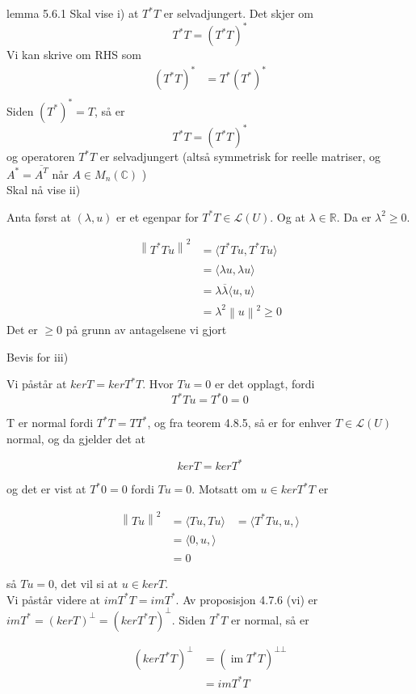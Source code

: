 \documentclass[a4paper,norsk]{article}
\renewcommand{\geq}{\geqslant}
\begin{document}
\begin{proofbox}{lemma 5.6.1}{}
Skal vise i) at $ T^* T $ er selvadjungert. Det skjer om
\[
    T^*T = \left( T^*T \right) ^*
\]
Vi kan skrive om RHS som \begin{align*}
    \left( T^*T \right) ^* &= T^* \left( T^* \right) ^*\\
\end{align*}
Siden $ \left( T^* \right) ^*  = T $, så er
\[
    T^*T = \left( T^*T \right) ^*
\]
og operatoren $ T^*T $ er selvadjungert (altså symmetrisk for reelle matriser, og $ A^* = \overline{A^T}$ når $ A \in M_n(\mathbb{C}) $ )\\


Skal nå vise ii)

Anta først at $ \left( \lambda , u \right)  $ er et egenpar for $ T^*T \in \mathcal{L}(U) $. Og at $ \lambda \in \mathbb{R} $. Da er $ \lambda ^2 \geq 0 $. 

\begin{align*}
    \left\lVert T^*Tu \right\rVert ^2 &= \langle T^*Tu, T^*Tu \rangle_{  } \\
    &= \langle \lambda u, \lambda u  \rangle_{  }  \\
    &= \lambda \overline{\lambda } \langle u, u  \rangle_{  } \\
    &= \lambda ^2 \left\lVert u \right\rVert ^2 \geq 0
\end{align*}
Det er $ \geq 0 $ på grunn av antagelsene vi gjort


Bevis for iii)

Vi påstår at $ ker T = ker T^*T $. Hvor $ Tu = 0 $ er det opplagt, fordi 
\[
    T^*Tu = T^*0 = 0
\]

T er normal fordi $ T^*T = TT^* $, og fra teorem 4.8.5, så er for enhver $ T \in \mathcal{L}(U) $ normal, og da gjelder det at

\[
    kerT = kerT^*
\]

og det er vist at $ T^* 0 = 0 $ fordi $ Tu = 0 $. Motsatt om $ u \in ker T^*T $ er 

\begin{align*}
    \left\lVert Tu \right\rVert ^2 &= \langle Tu, Tu \rangle_{  } 
    &= \langle T^*Tu, u,  \rangle_{  } \\
    &= \langle 0, u,  \rangle_{  } \\
    &=0 
\end{align*}

så $ Tu = 0 $, det vil si at $ u \in ker T $.\\

Vi påstår videre at $ imT^*T = imT^* $. Av proposisjon 4.7.6 (vi) er $ imT^* = \left( kerT \right) ^{\bot} = \left( ker T^* T \right) ^{\bot} $. Siden $ T^*T $ er normal, så er 

\begin{align*}
    \left( ker T^*T \right)^{\bot} &= \left( \operatorname{im} T^*T \right)^{\bot\bot} \\
    &= imT^*T   
\end{align*}
\end{proofbox}
\end{document}

